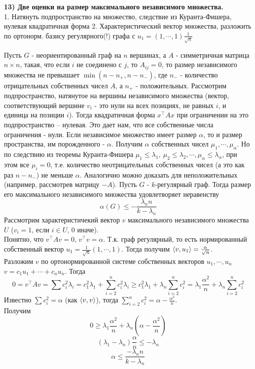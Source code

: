 \textbf{13)  Две оценки на размер максимального независимого множества.}\\
    
    1. Натянуть подпространство на  множество, следствие из Куранта-Фишера, нулевая квадратичная форма
    2. Характеристический вектор множества, разложить по ортонорм. базису регулярного(!) графа с $u_1 = (1,\cdots,1) \frac{1}{\sqrt n}$
    
    
    \thrm Пусть $G$ - неориентированный граф на $n$ вершинах, а $A$ - симметричная матрица $n \times n$, такая, что если $i$ не соединено с $j$, то $A_{ij} = 0$, то размер независимого множества не превышает $\min(n - n_{+}, n-n_{-})$, где $n_{-}$ - количество отрицательных собственных чисел $A$, а $n_{+}$ - положительных.
    \ethrm
    \proof
    Рассмотрим подпространство, натянутое на вершины независимого множества (вектор, соответствующий вершине $v_i$ - это нули на всех позициях, не равных $i$, и единица на позиции $i$). Тогда квадратичная форма $x^{\top}Ax$ при ограничении на это подпространство -- нулевая. Это дает нам, что все собственные числа ограничения - нули. Если независимое множество имеет размер $\alpha$, то и размер пространства, им порожденного - $\alpha$. Получим $\alpha$ собственных чисел $\mu_1, \cdots, \mu_{\alpha}$. Но по следствию из теоремы Куранта-Фишера $\mu_1 \le \lambda_1,\: \mu_2 \le \lambda_2, \cdots,\mu_{\alpha} \le \lambda_{\alpha}$, при этом все $\mu_i = 0$, т.е. количество неотрицательных собственных чисел (а это как раз $n - n_{-}$) не меньше $\alpha$. Аналогично можно доказать для неположительных (например, рассмотрев матрицу $-A$).
    \endproof
    \thrm Пусть $G$ - $k$-регулярный граф. Тогда размер его максимального независимого множества удовлетворяет неравенству
    $$\alpha(G) \le - \frac{\lambda_n n}{k - \lambda_n}$$
    \ethrm
    \proof
        Рассмотрим характеристичекий вектор $v$ максимального независимого множества $U$ ($v_i = 1$, если $i \in U$, 0 иначе).\\
        Понятно, что $v^{\top}Av = 0$, $v^{\top}v = \alpha$. Т.к. граф регулярный, то есть нормированный собственный вектор $u_1 = \frac{1}{\sqrt{n}}(1,\cdots,1)$. Тогда получим $\left\langle v, u_1 \right\rangle = \frac{\alpha}{\sqrt n}$.\\
        Разложим $v$ по ортонормированной системе собственных векторов $u_1, \cdots, u_n$ $v = c_1 u_1 + \cdots + c_n u_n$. Тогда
        $$0 = v^{\top}Av = \sum c_i^2 \lambda_i = c_1^2 \lambda_1 + \sum\limits_{i=2}^{n} c_i^2 \lambda_i \ge c_1^2 \lambda_1 + \lambda_n \sum\limits_{i=2}^{n} c_i^2 = \lambda_1 \frac{\alpha^2}{n} +\lambda_n \sum\limits_{i=2}^n c_i^2$$
        Известно $\sum c_i^2 = \alpha$ (как $\left\langle v,v \right\rangle$), тогда $\sum\limits_{i=2}^{n} c_i^2 = \alpha - \frac{\alpha^2}{n}$.\\ Получим $$0 \ge \lambda_1 \frac{\alpha^2}{n} + \lambda_n\left(\alpha - \frac{\alpha^2}{n}\right)$$
         $$(\lambda_1 - \lambda_n)\frac{\alpha}{n} \le -\lambda_n$$
         $$\alpha \le \frac{-\lambda_n n}{k - \lambda_n}$$
        
    \endproof